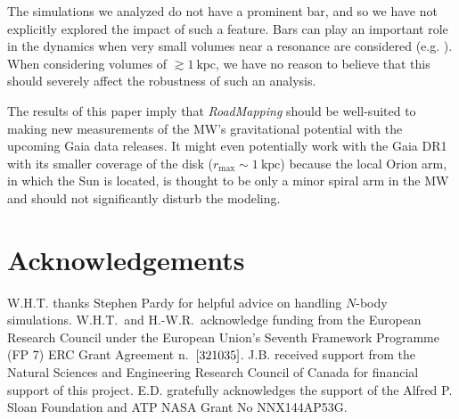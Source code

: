\documentclass[iop,revtex4,numberedappendix,appendixfloats]{emulateapj}
\newcommand{\RM}{{\sl RoadMapping}}
\begin{document}
The simulations we analyzed do not have a prominent bar, and so we have not explicitly explored the impact of such a feature. Bars can play an important role in the dynamics when very small volumes near a resonance are considered (e.g. \citealt{2000AJ....119..800D}). When considering volumes of $\gtrsim 1~\text{kpc}$, we have no reason to believe that this should severely affect the robustness of such an analysis.

The results of this paper imply that \RM{} should be well-suited to making new measurements of the MW's gravitational potential with the upcoming Gaia data releases. It might even potentially work with the Gaia DR1 with its smaller coverage of the disk ($r_\text{max}\sim 1~\text{kpc}$) because the local Orion arm, in which the Sun is located, is thought to be only a minor spiral arm in the MW and should not significantly disturb the modeling. 


\section{Acknowledgements}

W.H.T. thanks Stephen Pardy for helpful advice on handling $N$-body simulations. W.H.T.\ and H.-W.R.~acknowledge funding from the European Research Council under the European Union’s Seventh Framework Programme (FP 7) ERC Grant Agreement n.~${\rm [321035]}$. J.B. received support from the Natural Sciences and Engineering Research Council of Canada for financial support of this project. E.D. gratefully acknowledges the support of the Alfred P. Sloan Foundation and ATP NASA Grant No NNX144AP53G. 


{}

\end{document}
